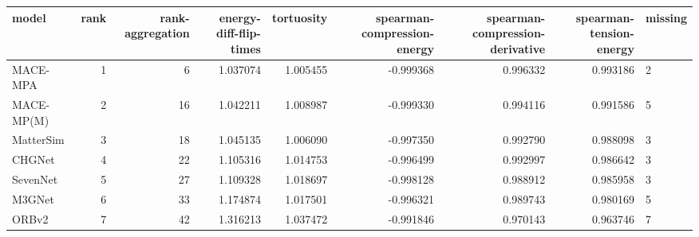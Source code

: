 \begin{tabular}{lrrrrrrrl}
\toprule
model & rank & rank-aggregation & energy-diff-flip-times & tortuosity & spearman-compression-energy & spearman-compression-derivative & spearman-tension-energy & missing \\
\midrule
MACE-MPA & 1 & 6 & 1.037074 & 1.005455 & -0.999368 & 0.996332 & 0.993186 & 2 \\
MACE-MP(M) & 2 & 16 & 1.042211 & 1.008987 & -0.999330 & 0.994116 & 0.991586 & 5 \\
MatterSim & 3 & 18 & 1.045135 & 1.006090 & -0.997350 & 0.992790 & 0.988098 & 3 \\
CHGNet & 4 & 22 & 1.105316 & 1.014753 & -0.996499 & 0.992997 & 0.986642 & 3 \\
SevenNet & 5 & 27 & 1.109328 & 1.018697 & -0.998128 & 0.988912 & 0.985958 & 3 \\
M3GNet & 6 & 33 & 1.174874 & 1.017501 & -0.996321 & 0.989743 & 0.980169 & 5 \\
ORBv2 & 7 & 42 & 1.316213 & 1.037472 & -0.991846 & 0.970143 & 0.963746 & 7 \\
\bottomrule
\end{tabular}
